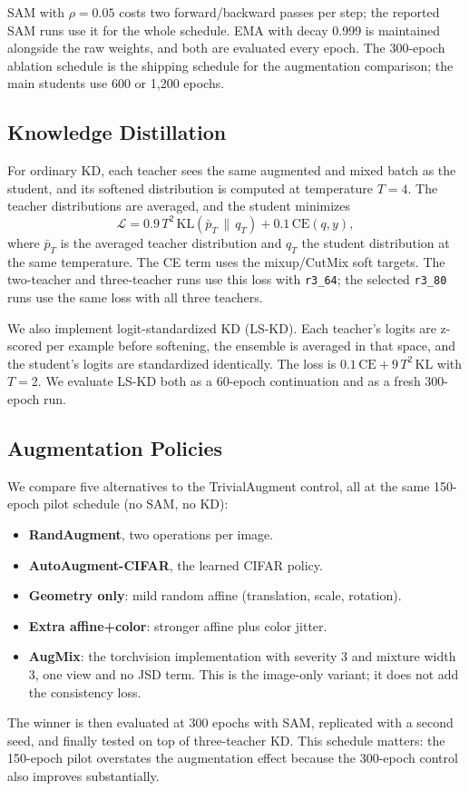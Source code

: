 SAM with $\rho=0.05$ costs two forward/backward passes per step; the reported SAM
runs use it for the whole schedule. EMA with decay 0.999 is maintained alongside
the raw weights, and both are evaluated every epoch. The 300-epoch ablation
schedule is the shipping schedule for the augmentation comparison; the main
students use 600 or 1,200 epochs.

\subsection{Knowledge Distillation}

For ordinary KD, each teacher sees the same augmented and mixed batch as the
student, and its softened distribution is computed at temperature $T=4$. The
teacher distributions are averaged, and the student minimizes
\begin{equation}
\mathcal{L} = 0.9\,T^2\,\mathrm{KL}\!\left(\bar{p}_T \,\|\, q_T\right)
+ 0.1\,\mathrm{CE}(q, y),
\end{equation}
where $\bar{p}_T$ is the averaged teacher distribution and $q_T$ the student
distribution at the same temperature. The CE term uses the mixup/CutMix soft
targets. The two-teacher and three-teacher runs use this loss with
\texttt{r3\_64}; the selected \texttt{r3\_80} runs use the same loss with all
three teachers.

We also implement logit-standardized KD (LS-KD). Each teacher's logits are
z-scored per example before softening, the ensemble is averaged in that space, and
the student's logits are standardized identically. The loss is
$0.1\,\mathrm{CE} + 9\,T^2\,\mathrm{KL}$ with $T=2$. We evaluate LS-KD both as a
60-epoch continuation and as a fresh 300-epoch run.

\subsection{Augmentation Policies}

We compare five alternatives to the TrivialAugment control, all at the same
150-epoch pilot schedule (no SAM, no KD):
\begin{itemize}
\item \textbf{RandAugment}, two operations per image.
\item \textbf{AutoAugment-CIFAR}, the learned CIFAR policy.
\item \textbf{Geometry only}: mild random affine (translation, scale, rotation).
\item \textbf{Extra affine+color}: stronger affine plus color jitter.
\item \textbf{AugMix}: the torchvision implementation with severity 3 and mixture
width 3, one view and no JSD term. This is the image-only variant; it does not add
the consistency loss.
\end{itemize}
The winner is then evaluated at 300 epochs with SAM, replicated with a second
seed, and finally tested on top of three-teacher KD. This schedule matters: the
150-epoch pilot overstates the augmentation effect because the 300-epoch control
also improves substantially.
